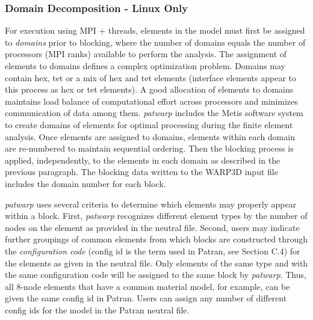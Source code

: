 \documentclass[11pt]{report}
\numberwithin{equation}{section}
\begin{document}
\subsubsection{Domain Decomposition - Linux Only}
\noindent For execution using MPI + threads, elements in the model must first be
assigned to \textit{domains} prior to blocking, where the number of domains equals the
number of processors (MPI ranks) available to perform the analysis. The assignment of
elements to domains defines a complex optimization problem. Domains may contain
hex, tet or a mix of hex and tet elements (interface elements appear to this
process as hex or tet elements). A good allocation of elements to domains
maintains load balance of computational effort across processors and minimizes
communication of data among them. \textit{patwarp} includes the Metis software system to
create domains of elements for optimal processing during the finite element
analysis. Once elements are assigned to domains, elements within each domain are
re-numbered to maintain sequential ordering. Then the blocking process is
applied, independently, to the elements in each domain as described in the
previous paragraph. The blocking data written to the WARP3D input file includes
the domain number for each block.

\textit{patwarp} uses several criteria to determine which elements may properly appear
within a block. First, \textit{patwarp} recognizes different element types by the number
of nodes on the element as provided in the neutral file. Second, users may
indicate further groupings of common elements from which blocks are constructed
through the \textit{configuration code} (config id is the term used in Patran, see
Section C.4) for the elements as given in the neutral file. Only elements of the
same type and with the same configuration code will be assigned to the same block
by \textit{patwarp}.
Thus, all 8-node elements that have a common material model, for example, can
be given the same config id in Patran. Users can assign any number of different
config ids for the model in the Patran neutral file.
\end{document}
